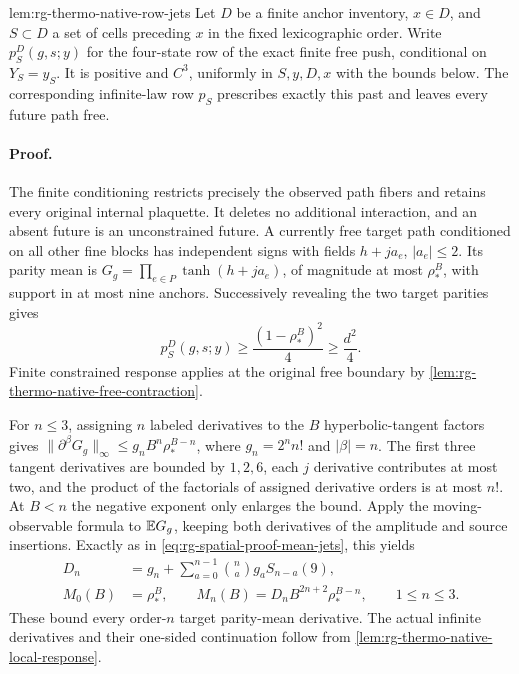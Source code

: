 {lem:rg-thermo-native-row-jets}
Let \(D\) be a finite anchor inventory, \(x\in D\), and \(S\subset D\)
a set of cells preceding \(x\) in the fixed lexicographic order. Write
\(p^D_S(g,s;y)\) for the four-state row of the exact finite free push,
conditional on \(Y_S=y_S\). It is positive and \(C^3\), uniformly in
\(S,y,D,x\) with the bounds below. The corresponding infinite-law row
\(p_S\) prescribes exactly this past and leaves every future path free.\thermoestablishedstatus


\paragraph{Proof.}
The finite conditioning restricts precisely the observed path fibers and
retains every original internal plaquette. It deletes no additional
interaction, and an absent future is an unconstrained future. A currently
free target path conditioned on all other fine blocks has independent
signs with fields \(h+j a_e\), \(|a_e|\le2\). Its parity mean is
\(G_g=\prod_{e\in P}\tanh(h+j a_e)\), of magnitude at most
\(\rho_*^B\), with support in at most nine anchors. Successively revealing
the two target parities gives
\begin{equation}
 p^D_S(g,s;y)\ge\frac{(1-\rho_*^B)^2}{4}\ge\frac{d^2}{4}.
 \label{eq:rg-thermo-native-row-positivity}
\end{equation}
Finite constrained response applies at the original free boundary by
\cref{lem:rg-thermo-native-free-contraction}.

For \(n\le3\), assigning \(n\) labeled derivatives to the \(B\)
hyperbolic-tangent factors gives
\(\|\partial^\beta G_g\|_\infty\le g_nB^n\rho_*^{B-n}\),
where \(g_n=2^n n!\) and \(|\beta|=n\). The first three tangent
derivatives are bounded by \(1,2,6\), each \(j\) derivative contributes
at most two, and the product of the factorials of assigned derivative
orders is at most \(n!\). At \(B<n\) the negative exponent only enlarges
the bound. Apply the moving-observable formula to \(\mathbb E G_g\), keeping
both derivatives of the amplitude and source insertions. Exactly as in
\cref{eq:rg-spatial-proof-mean-jets}, this yields
\begin{equation}
 \begin{split}
 D_n&=g_n+\sum_{a=0}^{n-1}{n\choose a}g_aS_{n-a}(9),\\
 M_0(B)&=\rho_*^B,\qquad
 M_n(B)=D_nB^{2n+2}\rho_*^{B-n},\qquad 1\le n\le3.
 \end{split}
 \label{eq:rg-thermo-native-parity-jets}
\end{equation}
These bound every order-\(n\) target parity-mean derivative. The actual
infinite derivatives and their one-sided continuation follow from
\cref{lem:rg-thermo-native-local-response}.

